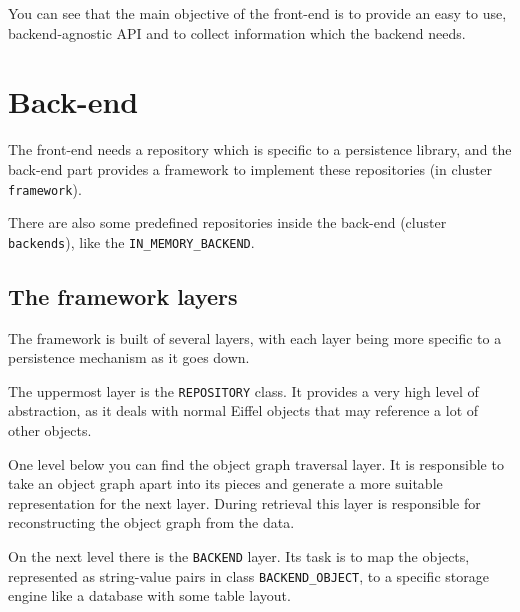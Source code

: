 \documentclass[a4paper,12pt]{report}
\begin{document}
You can see that the main objective of the front-end is to provide an easy to use, backend-agnostic API and to collect information which the backend needs.

% 


\section{Back-end}

The front-end needs a repository which is specific to a persistence library, and the back-end part provides a framework to implement these repositories (in cluster \lstinline!framework!).

There are also some predefined repositories inside the back-end (cluster \lstinline!backends!), like the \lstinline!IN_MEMORY_BACKEND!.

\subsection{The framework layers}

The framework is built of several layers, with each layer being more specific to a persistence mechanism as it goes down.

The uppermost layer is the \lstinline!REPOSITORY! class. 
It provides a very high level of abstraction, as it deals with normal Eiffel objects that may reference a lot of other objects.

One level below you can find the object graph traversal layer.
It is responsible to take an object graph apart into its pieces and generate a more suitable representation for the next layer.
During retrieval this layer is responsible for reconstructing the object graph from the data.

On the next level there is the \lstinline!BACKEND! layer.
Its task is to map the objects, represented as string-value pairs in class \lstinline!BACKEND_OBJECT!, 
to a specific storage engine like a database with some table layout.
\end{document}
